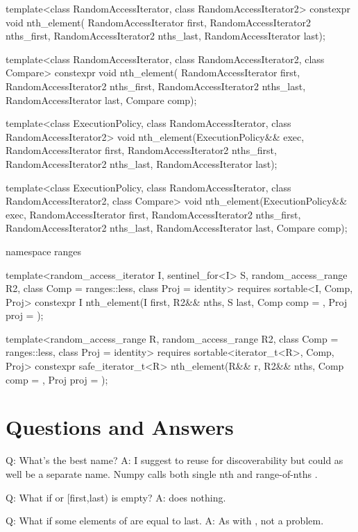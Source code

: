 \begin{codeblockAdd}
template<class RandomAccessIterator, class RandomAccessIterator2>
constexpr void nth_element(
RandomAccessIterator first, 
RandomAccessIterator2 nths_first, RandomAccessIterator2 nths_last,
RandomAccessIterator last);

template<class RandomAccessIterator, class RandomAccessIterator2, class Compare>
constexpr void nth_element(
RandomAccessIterator first, 
RandomAccessIterator2 nths_first, RandomAccessIterator2 nths_last,
RandomAccessIterator last, Compare comp);

template<class ExecutionPolicy, class RandomAccessIterator, class RandomAccessIterator2>
void nth_element(ExecutionPolicy&& exec,
RandomAccessIterator first, 
RandomAccessIterator2 nths_first, RandomAccessIterator2 nths_last,
RandomAccessIterator last);

template<class ExecutionPolicy, class RandomAccessIterator,
class RandomAccessIterator2, class Compare>
void nth_element(ExecutionPolicy&& exec,
RandomAccessIterator first, 
RandomAccessIterator2 nths_first, RandomAccessIterator2 nths_last,
RandomAccessIterator last, Compare comp);

namespace ranges {
  template<random_access_iterator I, sentinel_for<I> S, 
  random_access_range R2, class Comp = ranges::less, class Proj = identity>
  requires sortable<I, Comp, Proj>
  constexpr I nth_element(I first, R2&& nths, S last, Comp comp = {}, Proj proj = {});

  template<random_access_range R, 
  random_access_range R2,
  class Comp = ranges::less, class Proj = identity>
  requires sortable<iterator_t<R>, Comp, Proj>
  constexpr safe_iterator_t<R>
  nth_element(R&& r, R2&& nths, Comp comp = {}, Proj proj = {});
}
\end{codeblockAdd}


\section{Questions and Answers}

Q: What's the best name? A: I suggest to reuse  for discoverability but could as well be a separate name. Numpy calls both single nth and range-of-nths .

Q: What if  or [first,last) is empty? A:  does nothing.

Q: What if some elements of  are equal to last. A: As with , not a problem.

